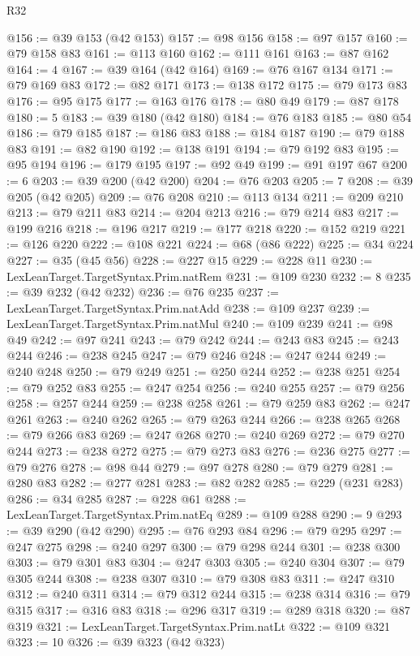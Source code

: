 \begin{lexlean}{R32}
\begin{coremodule}
@156 := @39 @153 (@42 @153)
@157 := @98 @156
@158 := @97 @157
@160 := @79 @158 @83
@161 := @113 @160
@162 := @111 @161
@163 := @87 @162
@164 := 4
@167 := @39 @164 (@42 @164)
@169 := @76 @167 @134
@171 := @79 @169 @83
@172 := @82 @171
@173 := @138 @172
@175 := @79 @173 @83
@176 := @95 @175
@177 := @163 @176
@178 := @80 @49
@179 := @87 @178
@180 := 5
@183 := @39 @180 (@42 @180)
@184 := @76 @183
@185 := @80 @54
@186 := @79 @185
@187 := @186 @83
@188 := @184 @187
@190 := @79 @188 @83
@191 := @82 @190
@192 := @138 @191
@194 := @79 @192 @83
@195 := @95 @194
@196 := @179 @195
@197 := @92 @49
@199 := @91 @197 @67
@200 := 6
@203 := @39 @200 (@42 @200)
@204 := @76 @203
@205 := 7
@208 := @39 @205 (@42 @205)
@209 := @76 @208
@210 := @113 @134
@211 := @209 @210
@213 := @79 @211 @83
@214 := @204 @213
@216 := @79 @214 @83
@217 := @199 @216
@218 := @196 @217
@219 := @177 @218
@220 := @152 @219
@221 := @126 @220
@222 := @108 @221
@224 := @68 (@86 @222)
@225 := @34 @224
@227 := @35 (@45 @56)
@228 := @227 @15
@229 := @228 @11
@230 := LexLeanTarget.TargetSyntax.Prim.natRem
@231 := @109 @230
@232 := 8
@235 := @39 @232 (@42 @232)
@236 := @76 @235
@237 := LexLeanTarget.TargetSyntax.Prim.natAdd
@238 := @109 @237
@239 := LexLeanTarget.TargetSyntax.Prim.natMul
@240 := @109 @239
@241 := @98 @49
@242 := @97 @241
@243 := @79 @242
@244 := @243 @83
@245 := @243 @244
@246 := @238 @245
@247 := @79 @246
@248 := @247 @244
@249 := @240 @248
@250 := @79 @249
@251 := @250 @244
@252 := @238 @251
@254 := @79 @252 @83
@255 := @247 @254
@256 := @240 @255
@257 := @79 @256
@258 := @257 @244
@259 := @238 @258
@261 := @79 @259 @83
@262 := @247 @261
@263 := @240 @262
@265 := @79 @263 @244
@266 := @238 @265
@268 := @79 @266 @83
@269 := @247 @268
@270 := @240 @269
@272 := @79 @270 @244
@273 := @238 @272
@275 := @79 @273 @83
@276 := @236 @275
@277 := @79 @276
@278 := @98 @44
@279 := @97 @278
@280 := @79 @279
@281 := @280 @83
@282 := @277 @281
@283 := @82 @282
@285 := @229 (@231 @283)
@286 := @34 @285
@287 := @228 @61
@288 := LexLeanTarget.TargetSyntax.Prim.natEq
@289 := @109 @288
@290 := 9
@293 := @39 @290 (@42 @290)
@295 := @76 @293 @84
@296 := @79 @295
@297 := @247 @275
@298 := @240 @297
@300 := @79 @298 @244
@301 := @238 @300
@303 := @79 @301 @83
@304 := @247 @303
@305 := @240 @304
@307 := @79 @305 @244
@308 := @238 @307
@310 := @79 @308 @83
@311 := @247 @310
@312 := @240 @311
@314 := @79 @312 @244
@315 := @238 @314
@316 := @79 @315
@317 := @316 @83
@318 := @296 @317
@319 := @289 @318
@320 := @87 @319
@321 := LexLeanTarget.TargetSyntax.Prim.natLt
@322 := @109 @321
@323 := 10
@326 := @39 @323 (@42 @323)

\end{coremodule}
\end{lexlean}
